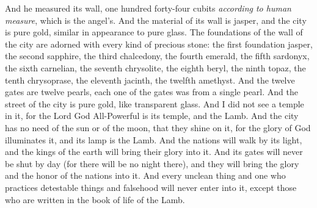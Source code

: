 \begin{biblechapter}
\verse And he measured its wall, one hundred forty-four cubits \textit{according to human measure}, which is the angel’s.
\verse And the material of its wall is jasper, and the city is pure gold, similar in appearance to pure glass.
\verse The foundations of the wall of the city are adorned with every kind of precious stone: the first foundation jasper, the second sapphire, the third chalcedony, the fourth emerald,
\verse the fifth sardonyx, the sixth carnelian, the seventh chrysolite, the eighth beryl, the ninth topaz, the tenth chrysoprase, the eleventh jacinth, the twelfth amethyst.
\verse And the twelve gates are twelve pearls, each one of the gates was from a single pearl. And the street of the city is pure gold, like transparent glass.
\verse And I did not see a temple in it, for the Lord God All-Powerful is its temple, and the Lamb.
\verse And the city has no need of the sun or of the moon, that they shine on it, for the glory of God illuminates it, and its lamp is the Lamb.
\verse And the nations will walk by its light, and the kings of the earth will bring their glory into it.
\verse And its gates will never be shut by day (for there will be no night there),
\verse and they will bring the glory and the honor of the nations into it.
\verse And every unclean thing and one who practices detestable things and falsehood will never enter into it, except those who are written in the book of life of the Lamb.
\end{biblechapter}

